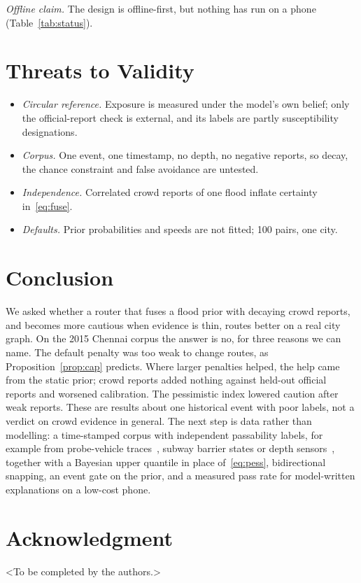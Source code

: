 \documentclass[conference]{IEEEtran}
\begin{document}
\emph{Offline claim.} The design is offline-first, but nothing has run on a phone (Table~\ref{tab:status}).

\section{Threats to Validity}\label{sec:threats}
\begin{itemize}
\item \emph{Circular reference.} Exposure is measured under the model's own belief; only the official-report check is external, and its labels are partly susceptibility designations.
\item \emph{Corpus.} One event, one timestamp, no depth, no negative reports, so decay, the chance constraint and false avoidance are untested.
\item \emph{Independence.} Correlated crowd reports of one flood inflate certainty in~\eqref{eq:fuse}.
\item \emph{Defaults.} Prior probabilities and speeds are not fitted; 100 pairs, one city.
\end{itemize}

\section{Conclusion}
We asked whether a router that fuses a flood prior with decaying crowd reports, and becomes more cautious when evidence is thin, routes better on a real city graph. On the 2015 Chennai corpus the answer is no, for three reasons we can name. The default penalty was too weak to change routes, as Proposition~\ref{prop:cap} predicts. Where larger penalties helped, the help came from the static prior; crowd reports added nothing against held-out official reports and worsened calibration. The pessimistic index lowered caution after weak reports. These are results about one historical event with poor labels, not a verdict on crowd evidence in general. The next step is data rather than modelling: a time-stamped corpus with independent passability labels, for example from probe-vehicle traces~\cite{hiramoto2025probe,pietrobon2019closure}, subway barrier states or depth sensors~\cite{mydlarz2024floodnet}, together with a Bayesian upper quantile in place of~\eqref{eq:pess}, bidirectional snapping, an event gate on the prior, and a measured pass rate for model-written explanations on a low-cost phone.

\section*{Acknowledgment}
\textless To be completed by the authors.\textgreater



\end{document}
